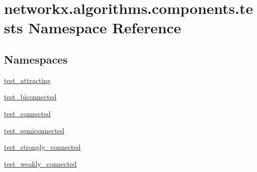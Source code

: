 \hypertarget{namespacenetworkx_1_1algorithms_1_1components_1_1tests}{}\section{networkx.\+algorithms.\+components.\+tests Namespace Reference}
\label{namespacenetworkx_1_1algorithms_1_1components_1_1tests}
\subsection*{Namespaces}
\begin{DoxyCompactItemize}
\item 
 \hyperlink{namespacenetworkx_1_1algorithms_1_1components_1_1tests_1_1test__attracting}{test\+\_\+attracting}
\item 
 \hyperlink{namespacenetworkx_1_1algorithms_1_1components_1_1tests_1_1test__biconnected}{test\+\_\+biconnected}
\item 
 \hyperlink{namespacenetworkx_1_1algorithms_1_1components_1_1tests_1_1test__connected}{test\+\_\+connected}
\item 
 \hyperlink{namespacenetworkx_1_1algorithms_1_1components_1_1tests_1_1test__semiconnected}{test\+\_\+semiconnected}
\item 
 \hyperlink{namespacenetworkx_1_1algorithms_1_1components_1_1tests_1_1test__strongly__connected}{test\+\_\+strongly\+\_\+connected}
\item 
 \hyperlink{namespacenetworkx_1_1algorithms_1_1components_1_1tests_1_1test__weakly__connected}{test\+\_\+weakly\+\_\+connected}
\end{DoxyCompactItemize}
